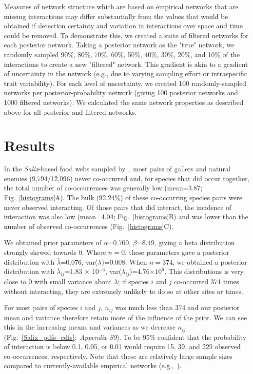 \documentclass[12pt]{article}
\begin{document}
\begin{spacing}{2.0}
      Measures of network structure which are based on empirical networks that are missing interactions may differ substantially from the values that would be obtained if detection certainty and variation in interactions over space and time could be removed. To demonstrate this, we created a suite of filtered networks for each posterior network. Taking a posterior network as the "true" network, we randomly sampled 90\%, 80\%, 70\%, 60\%, 50\%, 40\%, 30\%, 20\%, and 10\% of the interactions to create a new "filtered" network. This gradient is akin to a gradient of uncertainty in the network (e.g., due to varying sampling effort or intraspecific trait variability). For each level of uncertainty, we created 100 randomly-sampled networks per posterior-probability network (giving 100 posterior networks and 1000 filtered networks). We calculated the same network properties as described above for all posterior and filtered networks.


\section*{Results}

  In the \emph{Salix}-based food webs sampled by~\citet{Kopelke2017}, most pairs of gallers and natural enemies (9,794/12,096) never co-occurred and, for species that did occur together, the total number of co-occurrences was generally low (mean=3.87; Fig.~\ref{histograms}A). The bulk (92.24\%) of these co-occurring species pairs were never observed interacting. Of those pairs that did interact, the incidence of interaction was also low (mean=4.04; Fig.~\ref{histograms}B) and was lower than the number of observed co-occurrences (Fig.~\ref{histograms}C).


  We obtained prior parameters of $\alpha$=0.700, $\beta$=8.49, giving a beta distribution strongly skewed towards 0. Where $n=0$, these parameters gave a posterior distribution with $\bar\lambda$=0.076, var($\lambda$)=0.008. When $n=374$, we obtained a posterior distribution with $\bar\lambda_{ij}$=1.83 $\times$ 10$^{-3}$, var($\lambda_{ij}$)=4.76$\times10^6$. This distributions is very close to 0 with small variance about $\lambda$; if species $i$ and $j$ co-occurred 374 times without interacting, they are extremely unlikely to do so at other sites or times. 


  For most pairs of species $i$ and $j$, $n_{ij}$ was much less than 374 and our posterior mean and variance therefore retain more of the influence of the prior. We can see this in the increasing means and variances as we decrease $n_{ij}$ (Fig.~\ref{Salix_pdfs_cdfs};~\emph{Appendix S9}). To be 95\% confident that the probability of interaction is below 0.1, 0.05, or 0.01 would require 15, 39, and 229 observed co-occurrences, respectively. Note that these are relatively large sample sizes compared to currently-available empirical networks (e.g.,~\citealp{Morris2014}).



\end{spacing}
\end{document}
